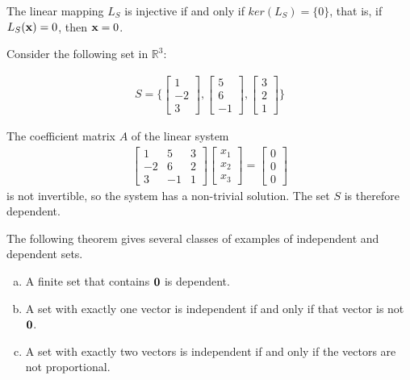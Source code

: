 \documentclass[12pt,letterpaper,reqno]{article}
\numberwithin{equation}{section}
\begin{document}
\begin{pf}
The linear mapping $L_S$ is injective if and only if $ker(L_S)=\{0\}$, that is, if $L_S({\bf x})=0$, then ${\bf x}=0$.	
\end{pf}

\begin{example}
Consider the following set in $\mathbb{R}^3$:

\begin{align*}
		S=\{\begin{bmatrix}
			1 \\ -2 \\ 3
		\end{bmatrix}, \begin{bmatrix}
			5 \\ 6 \\ -1
		\end{bmatrix},\begin{bmatrix}
			3 \\ 2 \\ 1
		\end{bmatrix}\}
	\end{align*}

	The coefficient matrix $A$ of the linear system
	\begin{align*}
		\begin{bmatrix}
			1 & 5 & 3 \\ -2 & 6 & 2 \\ 3 & -1 & 1
		\end{bmatrix}\begin{bmatrix}
			x_1 \\ x_2 \\ x_3
		\end{bmatrix}=\begin{bmatrix}
			0 \\ 0 \\ 0
		\end{bmatrix}
	\end{align*} is not invertible, so the system has a non-trivial solution. The set $S$ is therefore dependent.
\end{example}

The following theorem gives several classes of examples of independent and dependent sets.

\begin{thm} \hspace{10cm}
\begin{enumerate}[(a)]
			\item A finite set that contains ${\bf 0}$ is dependent.
			\item A set with exactly one vector is independent if and only if that vector is not ${\bf 0}$.
			\item A set with exactly two vectors is independent if and only if the vectors are not proportional.
		\end{enumerate}	
\end{thm}
\end{document}

